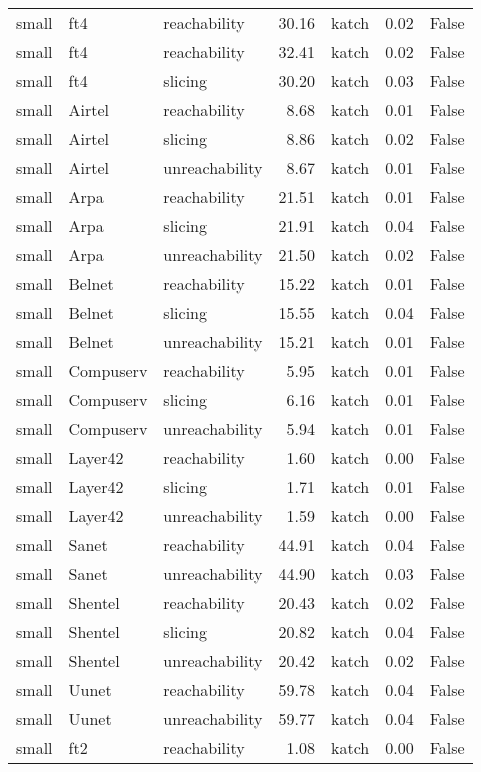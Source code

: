 \begin{tabular}{lllrlrr}
small & ft4 & reachability & 30.16 & katch & 0.02 & False \\
small & ft4 & reachability & 32.41 & katch & 0.02 & False \\
small & ft4 & slicing & 30.20 & katch & 0.03 & False \\
small & Airtel & reachability & 8.68 & katch & 0.01 & False \\
small & Airtel & slicing & 8.86 & katch & 0.02 & False \\
small & Airtel & unreachability & 8.67 & katch & 0.01 & False \\
small & Arpa & reachability & 21.51 & katch & 0.01 & False \\
small & Arpa & slicing & 21.91 & katch & 0.04 & False \\
small & Arpa & unreachability & 21.50 & katch & 0.02 & False \\
small & Belnet & reachability & 15.22 & katch & 0.01 & False \\
small & Belnet & slicing & 15.55 & katch & 0.04 & False \\
small & Belnet & unreachability & 15.21 & katch & 0.01 & False \\
small & Compuserv & reachability & 5.95 & katch & 0.01 & False \\
small & Compuserv & slicing & 6.16 & katch & 0.01 & False \\
small & Compuserv & unreachability & 5.94 & katch & 0.01 & False \\
small & Layer42 & reachability & 1.60 & katch & 0.00 & False \\
small & Layer42 & slicing & 1.71 & katch & 0.01 & False \\
small & Layer42 & unreachability & 1.59 & katch & 0.00 & False \\
small & Sanet & reachability & 44.91 & katch & 0.04 & False \\
small & Sanet & unreachability & 44.90 & katch & 0.03 & False \\
small & Shentel & reachability & 20.43 & katch & 0.02 & False \\
small & Shentel & slicing & 20.82 & katch & 0.04 & False \\
small & Shentel & unreachability & 20.42 & katch & 0.02 & False \\
small & Uunet & reachability & 59.78 & katch & 0.04 & False \\
small & Uunet & unreachability & 59.77 & katch & 0.04 & False \\
small & ft2 & reachability & 1.08 & katch & 0.00 & False \\

\end{tabular}
